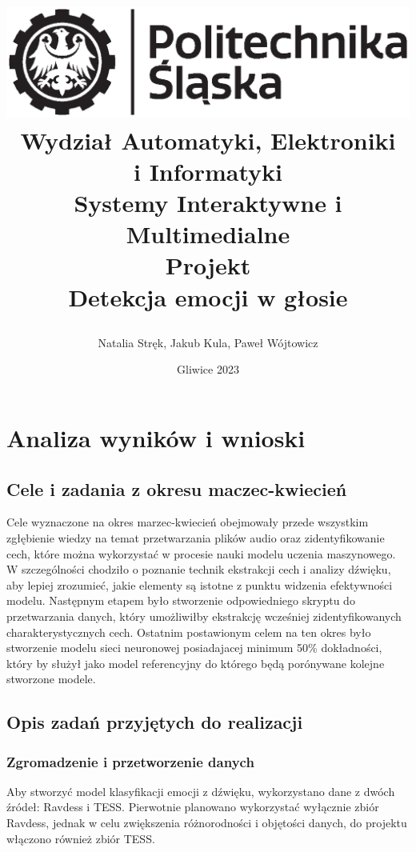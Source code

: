 \documentclass[12pt,titlepage]{article}
\title{
\includegraphics[scale=0.75]{img/politechnika_sl_logo_bw_poziom_pl.eps}\\
\textbf{Wydział Automatyki, Elektroniki\\
i Informatyki}\\
\vspace*{1cm}
Systemy Interaktywne i Multimedialne \\ Projekt \\ Detekcja emocji w głosie

\vspace*{5cm}
}
\author{
Natalia Stręk,
Jakub Kula,
Paweł Wójtowicz
}
\date{Gliwice 2023}
\begin{document}
\maketitle


\newpage
\section{Analiza wyników i wnioski}
\subsection{Cele i zadania z okresu maczec-kwiecień}
Cele wyznaczone na okres marzec-kwiecień obejmowały przede wszystkim zgłębienie wiedzy na temat przetwarzania plików audio oraz zidentyfikowanie cech, które można wykorzystać w procesie nauki modelu uczenia maszynowego. W szczególności chodziło o poznanie technik ekstrakcji cech i analizy dźwięku, aby lepiej zrozumieć, jakie elementy są istotne z punktu widzenia efektywności modelu.
Następnym etapem było stworzenie odpowiedniego skryptu do przetwarzania danych, który umożliwiłby ekstrakcję wcześniej zidentyfikowanych charakterystycznych cech. Ostatnim postawionym celem na ten okres było stworzenie modelu sieci neuronowej posiadajacej minimum 50\% dokładności, który by służył jako model referencyjny do którego będą porónywane kolejne stworzone modele.\\

\subsection{Opis zadań przyjętych do realizacji}
\subsubsection{Zgromadzenie i przetworzenie danych}
Aby stworzyć model klasyfikacji emocji z dźwięku, wykorzystano dane z dwóch źródeł: Ravdess i TESS. Pierwotnie planowano wykorzystać wyłącznie zbiór Ravdess, jednak w celu zwiększenia różnorodności i objętości danych, do projektu włączono również zbiór TESS.
\end{document}
